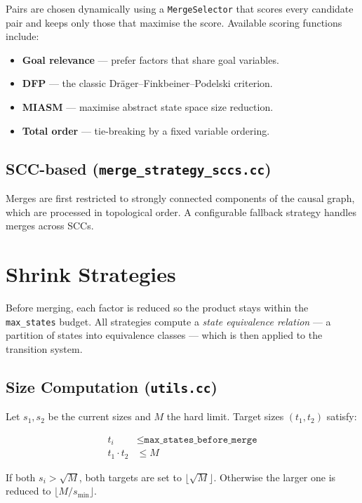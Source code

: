 \documentclass[11pt,a4paper]{article}
\begin{document}
Pairs are chosen dynamically using a \texttt{MergeSelector} that scores every
candidate pair and keeps only those that maximise the score.  Available scoring
functions include:

\begin{itemize}
  \item \textbf{Goal relevance} --- prefer factors that share goal variables.
  \item \textbf{DFP} --- the classic Dräger--Finkbeiner--Podelski criterion.
  \item \textbf{MIASM} --- maximise abstract state space size reduction.
  \item \textbf{Total order} --- tie-breaking by a fixed variable ordering.
\end{itemize}

\subsection{SCC-based (\texttt{merge\_strategy\_sccs.cc})}

Merges are first restricted to strongly connected components of the causal
graph, which are processed in topological order.  A configurable fallback
strategy handles merges across SCCs.

\section{Shrink Strategies}

Before merging, each factor is reduced so the product stays within the
\texttt{max\_states} budget.  All strategies compute a
\emph{state equivalence relation} --- a partition of states into equivalence
classes --- which is then applied to the transition system.

\subsection{Size Computation (\texttt{utils.cc})}

Let $s_1, s_2$ be the current sizes and $M$ the hard limit.  Target sizes
$(t_1, t_2)$ satisfy:

\begin{align}
  t_i &\leq \texttt{max\_states\_before\_merge} \\
  t_1 \cdot t_2 &\leq M
\end{align}

If both $s_i > \sqrt{M}$, both targets are set to $\lfloor\sqrt{M}\rfloor$.
Otherwise the larger one is reduced to $\lfloor M / s_{\min} \rfloor$.
\end{document}
